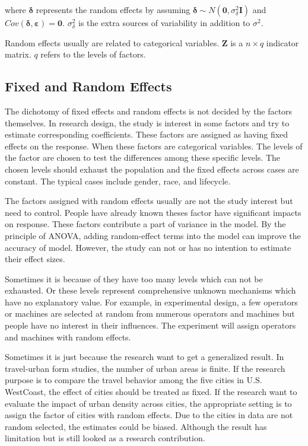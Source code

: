\documentclass[
  11pt,
  openany]{memoir}
\begin{document}
where \(\boldsymbol{\delta}\) represents the random effects by assuming \(\boldsymbol{\delta}\sim N(\mathbf{0}, \sigma_\delta^2\mathbf{I})\) and \(Cov(\boldsymbol{\delta},\boldsymbol{\varepsilon})=\mathbf{0}\).
\(\sigma_\delta^2\) is the extra sources of variability in addition to \(\sigma^2\).

Random effects usually are related to categorical variables.
\(\mathbf{Z}\) is a \(n\times q\) indicator matrix. \(q\) refers to the levels of factors.

\hypertarget{fixed-and-random-effects}{%
\subsection{Fixed and Random Effects}\label{fixed-and-random-effects}}

The dichotomy of fixed effects and random effects is not decided by the factors themselves.
In research design, the study is interest in some factors and try to estimate corresponding coefficients.
These factors are assigned as having fixed effects on the response.
When these factors are categorical variables. The levels of the factor are chosen to test the differences among these specific levels. The chosen levels should exhaust the population and the fixed effects across cases are constant. The typical cases include gender, race, and lifecycle.

The factors assigned with random effects usually are not the study interest but need to control.
People have already known theses factor have significant impacts on response.
These factors contribute a part of variance in the model. By the principle of ANOVA, adding random-effect terms into the model can improve the accuracy of model.
However, the study can not or has no intention to estimate their effect sizes.

Sometimes it is because of they have too many levels which can not be exhausted.
Or these levels represent comprehensive unknown mechanisms which have no explanatory value.
For example, in experimental design, a few operators or machines are selected at random from numerous operators and machines but people have no interest in their influences. The experiment will assign operators and machines with random effects.

Sometimes it is just because the research want to get a generalized result.
In travel-urban form studies, the number of urban areas is finite. If the research purpose is to
compare the travel behavior among the five cities in U.S. WestCoast, the effect of cities should be treated as fixed.
If the research want to evaluate the impact of urban density across cities, the appropriate setting is to assign the factor of cities with random effects.
Due to the cities in data are not random selected, the estimates could be biased. Although the result has limitation but is still looked as a research contribution.
\end{document}
